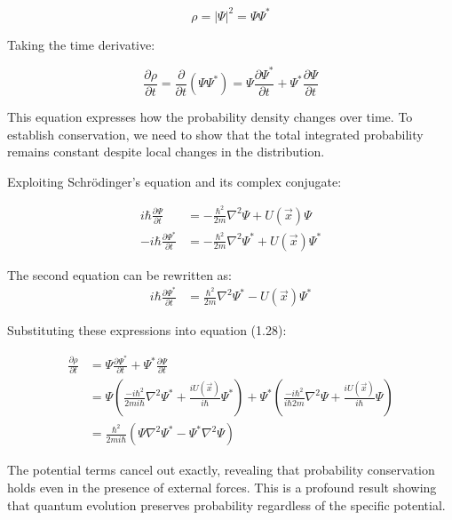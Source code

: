 \documentclass[10pt]{article}
\begin{document}
\begin{equation*}
\rho=|\Psi|^{2}=\Psi \Psi^{*} \tag{1.27}
\end{equation*}

Taking the time derivative:

\begin{equation*}
\frac{\partial \rho}{\partial t}=\frac{\partial}{\partial t}(\Psi \Psi^{*})=\Psi \frac{\partial \Psi^{*}}{\partial t}+\Psi^{*} \frac{\partial \Psi}{\partial t} \tag{1.28}
\end{equation*}

This equation expresses how the probability density changes over time. To establish conservation, we need to show that the total integrated probability remains constant despite local changes in the distribution.


Exploiting Schrödinger's equation and its complex conjugate:

\begin{align*}
i \hbar \frac{\partial \Psi}{\partial t} &= -\frac{\hbar^{2}}{2 m} \nabla^{2} \Psi+U(\vec{x}) \Psi \\
-i \hbar \frac{\partial \Psi^{*}}{\partial t} &= -\frac{\hbar^{2}}{2 m} \nabla^{2} \Psi^{*}+U(\vec{x}) \Psi^{*} \tag{1.29}
\end{align*}

The second equation can be rewritten as:
\begin{align*}
i \hbar \frac{\partial \Psi^{*}}{\partial t} &= \frac{\hbar^{2}}{2 m} \nabla^{2} \Psi^{*}-U(\vec{x}) \Psi^{*}
\end{align*}

Substituting these expressions into equation (1.28):

\begin{align*}
\frac{\partial \rho}{\partial t} &= \Psi \frac{\partial \Psi^{*}}{\partial t}+\Psi^{*} \frac{\partial \Psi}{\partial t} \\
&= \Psi\left(\frac{-i\hbar^{2}}{2m i\hbar} \nabla^{2} \Psi^{*}+\frac{iU(\vec{x})}{i\hbar} \Psi^{*}\right)+\Psi^{*}\left(\frac{-i\hbar^{2}}{i\hbar 2 m} \nabla^{2} \Psi+\frac{iU(\vec{x})}{i\hbar} \Psi\right) \tag{1.30}\\
&= \frac{\hbar^{2}}{2m i\hbar}\left(\Psi \nabla^{2} \Psi^{*}-\Psi^{*} \nabla^{2} \Psi\right)
\end{align*}

The potential terms cancel out exactly, revealing that probability conservation holds even in the presence of external forces. This is a profound result showing that quantum evolution preserves probability regardless of the specific potential.
\end{document}
